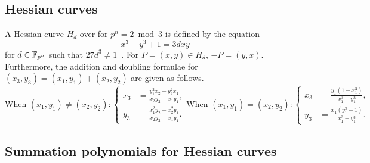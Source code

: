 %
%

\subsection{Hessian curves}
\label{sec:hessian}

%
A Hessian curve $H_d$ over  for $p^n=2\bmod 3$ is defined by
the equation \begin{equation}
  x^3+y^3+1=3dxy \label{eq:hessian-curve} \end{equation} for
$d\in\mathbb F_{p^n}$ such that $27d^3\neq 1$~\cite{DBLP:conf/ches/Smart01}.
%
For $P=(x,y)\in H_d$, $-P=(y,x)$.
%
Furthermore, the addition and doubling formulae for
$(x_3,y_3)=(x_1,y_1)+(x_2,y_2)$ are given as follows.
%
\[ \text{When }(x_1,y_1)\neq(x_2,y_2):\left\{\begin{aligned}
      x_3 & = \frac{y_1^2x_2 - y_2^2x_1}{x_2y_2 - x_1y_1}, \\
      y_3 & = \frac{x_1^2y_2 - x_2^2y_1}{x_2y_2 - x_1y_1}.
    \end{aligned}\right. \text{When }(x_1,y_1)=(x_2,y_2):\left\{\begin{aligned}
      x_3 & = \frac{y_1(1 - x_1^3)}{x_1^3 - y_1^3}, \\
      y_3 & = \frac{x_1(y_1^3 - 1)}{x_1^3 - y_1^3}.
    \end{aligned}\right. \]

\subsection{Summation polynomials for Hessian curves}
\label{sec:hessian-t2}

